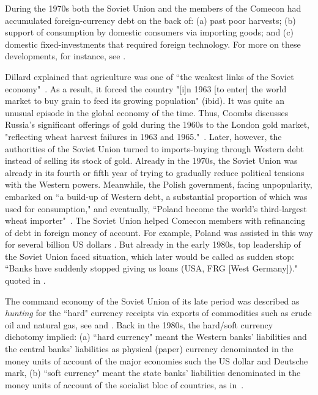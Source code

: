 During the 1970s both the Soviet Union and the members of the Comecon
had accumulated foreign-currency debt on the back of: (a) past poor
harvests; (b) support of consumption by domestic consumers via importing
goods; and (c) domestic fixed-investments that required foreign
technology. For more on these developments, for instance, see \citep{coombs1976,gaidar2002,harold}.

Dillard explained that agriculture was one of ``the weakest links of the
Soviet economy"~\citep[p.~628]{dillard1967}. As a result, it forced the country
"[i]n 1963 [to enter] the world market to buy grain to feed its growing
population" (ibid). It was quite an unusual episode in the global
economy of the time. Thus, Coombs discusses Russia's significant
offerings of gold during the 1960s to the London gold market,
"reflecting wheat harvest failures in 1963 and 1965."~\citep[p.~154]{coombs1976}.
Later, however, the authorities of the Soviet Union turned to
imports-buying through Western debt instead of selling its stock of
gold. Already in the 1970s, the Soviet Union was already in its fourth
or fifth year of trying to gradually reduce political tensions with the
Western powers. Meanwhile, the Polish government, facing unpopularity,
embarked on ``a build-up of Western debt, a substantial proportion of
which was used for consumption," and eventually, ``Poland become the
world's third-largest wheat importer"~\citep[pp.~89-90]{harold}. The Soviet
Union helped Comecon members with refinancing of debt in foreign money
of account. For example, Poland was assisted in this way for several
billion US dollars \citep{stasi1981}. But already in the early 1980s, top
leadership of the Soviet Union faced situation, which later would be
called as sudden stop: ``Banks have suddenly stopped giving us loans
(USA, FRG [West Germany])." \citep{stasi1981} quoted in \citep[pp.~15-16]{zubok2021}.

The command economy of the Soviet Union of its late period was described
as \textit{hunting} for the ``hard" currency receipts via exports of commodities
such as crude oil and natural gas, see \citep[p.~222]{dibb1988} and \citep{zubok2021}. Back
in the 1980s, the hard/soft currency dichotomy implied: (a) ``hard
currency" meant the Western banks' liabilities and the central banks'
liabilities as physical (paper) currency denominated in the money units
of account of the major economies such the US dollar and Deutsche mark,
(b) ``soft currency" meant the state banks' liabilities denominated in
the money units of account of the socialist bloc of countries, as in~\citep{dibb1988}.


